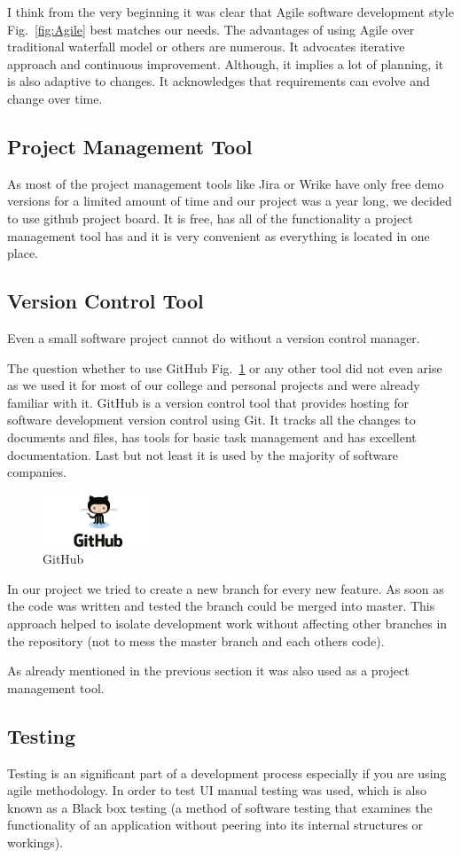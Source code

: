 I think from the very beginning it was clear that Agile software development style Fig.~\ref{fig:Agile} best matches our needs.
The advantages of using Agile over traditional waterfall model or others are numerous. It advocates iterative approach and continuous improvement. Although, it implies a lot of planning, it is also adaptive to changes. It acknowledges that requirements can evolve and change over time.

\subsection{Project Management Tool}
\indent
\indent
As most of the project management tools like Jira or Wrike have only free demo versions for a limited amount of time and our project was a year long, we decided to use github project board. It is free, has all of the functionality a project management tool has and it is very convenient as everything is located in one place.

\subsection{Version Control Tool}
\indent
\indent
Even a small software project cannot do without a version control manager.

The question whether to use GitHub Fig.~\ref{fig:GitHub} or any other tool did not even arise as we used it for most of our college and personal projects and were already familiar with it.
GitHub is a version control tool that provides hosting for software development version control using Git.
It tracks all the changes to documents and files, has tools for basic task management and has excellent documentation. Last but not least it is used by the majority of software companies.

\begin{figure}[ht]
	\centering
	\includegraphics[width=0.3\textwidth]{img/github.png}
	\caption{GitHub}
	\label{fig:GitHub}
\end{figure}

In our project we tried to create a new branch for every new feature. As soon as the code was written and tested the branch could be merged into master. This approach helped to isolate development work without affecting other branches in the repository (not to mess the master branch and each others code).

As already mentioned in the previous section it was also used as a project management tool.

\subsection{Testing}
\indent
\indent
Testing is an significant part of a development process especially if you are using agile methodology.
In order to test UI manual testing was used, which is also known as a Black box testing (a method of software testing that examines the functionality of an application without peering into its internal structures or workings).
